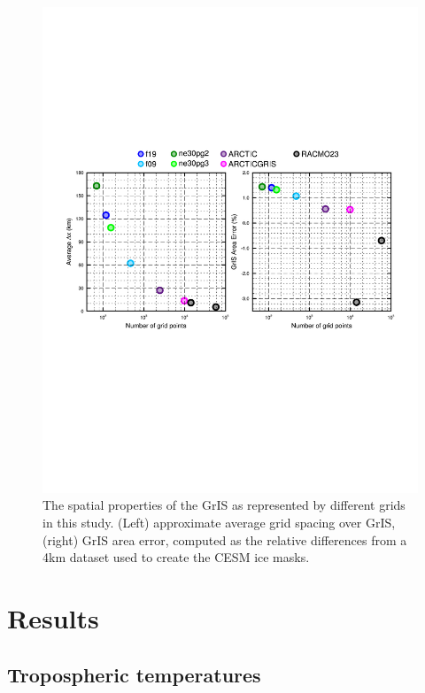 \documentclass[draft]{agujournal2019}
\begin{document}
\begin{figure}[t]
\begin{center}
         \includegraphics[width=130mm]{figs/temp_grisres.pdf}
\end{center}
\caption{The spatial properties of the GrIS as represented by different grids in this study. (Left) approximate average grid spacing over GrIS, (right) GrIS area error, computed as the relative differences from a 4km dataset used to create the CESM ice masks.}
\label{fig:grisdx}
\end{figure}

\section{Results}\label{sec:results}

\subsection{Tropospheric temperatures}
\end{document}
